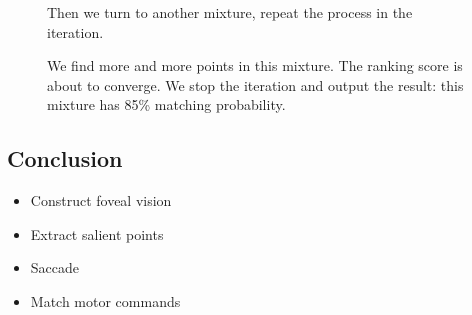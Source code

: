 \documentclass{beamer}
\begin{document}
\begin{frame}
\begin{figure}
  \caption{Then we turn to another mixture, repeat the process in the iteration.}

\end{figure}   
\end{frame}


\begin{frame}
\begin{figure}
  \caption{We find more and more points in this mixture. The ranking score is about to converge. We stop the iteration and output the result: this mixture has 85\% matching probability.}

\end{figure}   
\end{frame}


\subsection{Conclusion}
\begin{frame}

\begin{itemize}
\item Construct foveal vision%
\item Extract salient points%
\item Saccade%
\item Match motor commands%
\end{itemize}
\end{frame}
\end{document}
